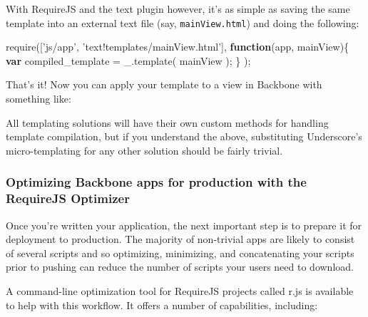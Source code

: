 \documentclass[9pt]{book}
\newenvironment{Shaded}{}{}
\newcommand{\KeywordTok}[1]{\textcolor[rgb]{0.00,0.44,0.13}{\textbf{{#1}}}}
\newcommand{\DataTypeTok}[1]{\textcolor[rgb]{0.56,0.13,0.00}{{#1}}}
\newcommand{\StringTok}[1]{\textcolor[rgb]{0.25,0.44,0.63}{{#1}}}
\newcommand{\OtherTok}[1]{\textcolor[rgb]{0.00,0.44,0.13}{{#1}}}
\newcommand{\FunctionTok}[1]{\textcolor[rgb]{0.02,0.16,0.49}{{#1}}}
\newcommand{\NormalTok}[1]{{#1}}
\begin{document}
With RequireJS and the text plugin however, it's as simple as saving the
same template into an external text file (say, \texttt{mainView.html})
and doing the following:

\begin{Shaded}
\begin{Highlighting}[]
\FunctionTok{require}\NormalTok{([}\StringTok{'js/app'}\NormalTok{, }\StringTok{'text!templates/mainView.html'}\NormalTok{],}
    \KeywordTok{function}\NormalTok{(app, mainView)\{}
        \KeywordTok{var} \NormalTok{compiled_template = }\OtherTok{_}\NormalTok{.}\FunctionTok{template}\NormalTok{( mainView );}
    \NormalTok{\}}
\NormalTok{);}
\end{Highlighting}
\end{Shaded}

That's it! Now you can apply your template to a view in Backbone with
something like:

\begin{Shaded}
\end{Shaded}

All templating solutions will have their own custom methods for handling
template compilation, but if you understand the above, substituting
Underscore's micro-templating for any other solution should be fairly
trivial.

\subsubsection{Optimizing Backbone apps for production with the
RequireJS
Optimizer}\label{optimizing-backbone-apps-for-production-with-the-requirejs-optimizer}

Once you're written your application, the next important step is to
prepare it for deployment to production. The majority of non-trivial
apps are likely to consist of several scripts and so optimizing,
minimizing, and concatenating your scripts prior to pushing can reduce
the number of scripts your users need to download.

A command-line optimization tool for RequireJS projects called r.js is
available to help with this workflow. It offers a number of
capabilities, including:
\end{document}
